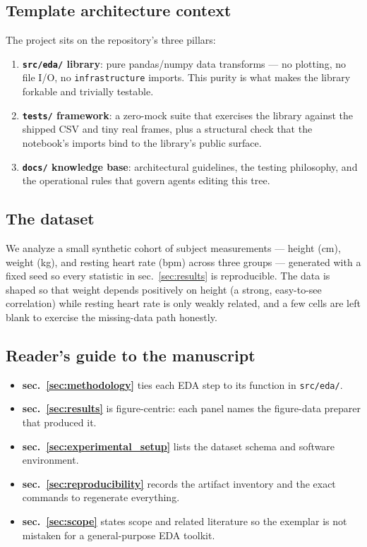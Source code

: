 \documentclass[
]{article}
\providecommand{\tightlist}{%
  \setlength{\itemsep}{0pt}\setlength{\parskip}{0pt}}
\begin{document}
\subsection{Template architecture
context}\label{template-architecture-context}

The project sits on the repository's three pillars:

\begin{enumerate}
\def\labelenumi{\arabic{enumi}.}
\tightlist
\item
  \textbf{\texttt{src/eda/} library}: pure pandas/numpy data transforms
  --- no plotting, no file I/O, no \texttt{infrastructure} imports. This
  purity is what makes the library forkable and trivially testable.
\item
  \textbf{\texttt{tests/} framework}: a zero-mock suite that exercises
  the library against the shipped CSV and tiny real frames, plus a
  structural check that the notebook's imports bind to the library's
  public surface.
\item
  \textbf{\texttt{docs/} knowledge base}: architectural guidelines, the
  testing philosophy, and the operational rules that govern agents
  editing this tree.
\end{enumerate}

\subsection{The dataset}\label{the-dataset}

We analyze a small synthetic cohort of subject measurements --- height
(cm), weight (kg), and resting heart rate (bpm) across three groups ---
generated with a fixed seed so every statistic in sec.~\ref{sec:results}
is reproducible. The data is shaped so that weight depends positively on
height (a strong, easy-to-see correlation) while resting heart rate is
only weakly related, and a few cells are left blank to exercise the
missing-data path honestly.

\subsection{Reader's guide to the
manuscript}\label{readers-guide-to-the-manuscript}

\begin{itemize}
\tightlist
\item
  \textbf{sec.~\ref{sec:methodology}} ties each EDA step to its function
  in \texttt{src/eda/}.
\item
  \textbf{sec.~\ref{sec:results}} is figure-centric: each panel names
  the figure-data preparer that produced it.
\item
  \textbf{sec.~\ref{sec:experimental_setup}} lists the dataset schema
  and software environment.
\item
  \textbf{sec.~\ref{sec:reproducibility}} records the artifact inventory
  and the exact commands to regenerate everything.
\item
  \textbf{sec.~\ref{sec:scope}} states scope and related literature so
  the exemplar is not mistaken for a general-purpose EDA toolkit.
\end{itemize}
\end{document}
